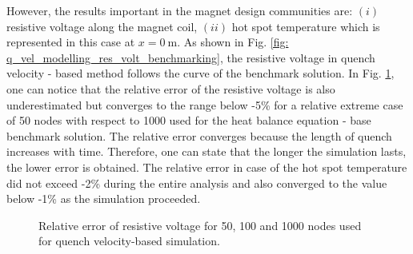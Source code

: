 However, the results important in the magnet design communities are: $(i)$ resistive voltage along the magnet coil, $(ii)$ hot spot temperature which is represented in this case at $x = 0~\text{m}$. As shown in Fig. \ref{fig: q_vel_modelling_res_volt_benchmarking}, the resistive voltage in quench velocity - based method follows the curve of the benchmark solution. In Fig. \ref{fig: q_vel_modelling_res_volt_rel_error}, one can notice that the relative error of the resistive voltage is also underestimated but converges to the range below -5\% for a relative extreme case of 50 nodes with respect to 1000 used for the heat balance equation - base benchmark solution. The relative error converges because the length of quench increases with time. Therefore, one can state that the longer the simulation lasts, the lower error is obtained. The relative error in case of the hot spot temperature did not exceed -2\% during the entire analysis and also converged to the value below -1\% as the simulation proceeded.

\begin{figure}[h!]
\centering
    \caption{Relative error of resistive voltage for 50, 100 and 1000 nodes used for quench velocity-based simulation.}
    \label{fig: q_vel_modelling_res_volt_rel_error}
\end{figure}

